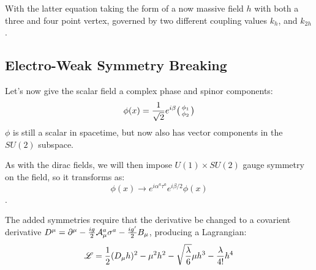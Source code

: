         With the latter equation taking the form of a now massive field $h$ with both a three and four point vertex,
            governed by two different coupling values $k_{h}$, and $k_{2h}$.

        \cite{Halzen_book}

        

    \subsection{Electro-Weak Symmetry Breaking}

        Let's now give the scalar field a complex phase and spinor components:
        \begin{equation}
            \phi(x) = \frac{1}{\sqrt{2}} e^{i \beta} \big(\begin{smallmatrix} \phi_1 \\ \phi_2 \end{smallmatrix}\big)
        \end{equation}
        $\phi$ is still a scalar in spacetime, but now also has vector components in the $SU(2)$ subspace.

        As with the dirac fields, we will then impose $U(1) \times SU(2)$ gauge symmetry on the field, so it transforms as:
        \begin{equation}
            \phi(x) \rightarrow e^{i \alpha^a \tau^a} e^{i \beta/2 } \phi(x)
        \end{equation}.

        The added symmetries require that the derivative be changed to a covarient derivative 
            $D^{\mu} = \partial^{\mu} - \frac{ig}{2} \mathcal{A}^a_{\mu} \sigma^a - \frac{ig'}{2} B_{\mu}$,
            producing a Lagrangian:
        \begin{equation} \begin{split}
            \mathscr{L} & = \frac{1}{2} (D_{\mu} h)^2
                - \mu^2 h^2
                -\sqrt{\frac{\lambda}{6}} \mu h^3
                - \frac{\lambda}{4!} h^4 \\
        \end{split} \end{equation}

